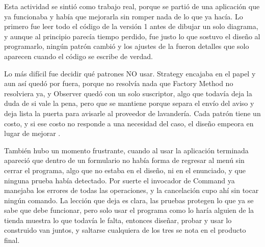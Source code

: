 %
%

Esta actividad se sintió como trabajo real, porque se partió de una aplicación que ya funcionaba y había que mejorarla sin romper nada de lo que ya hacía. Lo primero fue leer todo el código de la versión 1 antes de dibujar un solo diagrama, y aunque al principio parecía tiempo perdido, fue justo lo que sostuvo el diseño al programarlo, ningún patrón cambió y los ajustes de la  fueron detalles que solo aparecen cuando el código se escribe de verdad.

Lo más difícil fue decidir qué patrones NO usar. Strategy encajaba en el papel y aun así quedó por fuera, porque no resolvía nada que Factory Method no resolviera ya, y Observer quedó con un solo suscriptor, algo que todavía deja la duda de si vale la pena, pero que se mantiene porque separa el envío del aviso y deja lista la puerta para avisarle al proveedor de lavandería. Cada patrón tiene un costo, y si ese costo no responde a una necesidad del caso, el diseño empeora en lugar de mejorar .

También hubo un momento frustrante, cuando al usar la aplicación terminada apareció que dentro de un formulario no había forma de regresar al menú sin cerrar el programa, algo que no estaba en el diseño, ni en el enunciado, y que ninguna prueba había detectado. Por suerte el invocador de Command ya manejaba los errores de todas las operaciones, y la cancelación cupo ahí sin tocar ningún comando. La lección que deja es clara, las pruebas protegen lo que ya se sabe que debe funcionar, pero solo usar el programa como lo haría alguien de la tienda muestra lo que todavía le falta, entonces diseñar, probar y usar lo construido van juntos, y saltarse cualquiera de los tres se nota en el producto final.
